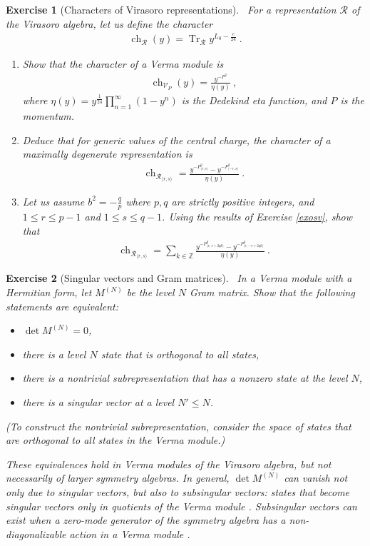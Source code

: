 \documentclass[12pt, a4paper, notitlepage, twoside]{report}
\numberwithin{equation}{section}
\theoremstyle{break}
\newtheorem{exo}{Exercise}[chapter]
\begin{document}
\begin{exo}[Characters of Virasoro representations]
 ~\label{exochar}
For a representation $\mathcal{R}$ of the Virasoro algebra, let us define the character 
\begin{align}
 \operatorname{ch}_\mathcal{R}(y) = \operatorname{Tr}_\mathcal{R} y^{L_0-\frac{c}{24}}\ .
\end{align}
\begin{enumerate}
 \item 
Show that the character of a Verma module is 
\begin{align}
 \operatorname{ch}_{\mathcal{V}_P}(y) = \frac{y^{-P^2}}{\eta(y)}\ ,
\end{align}
where $\eta(y) = y^{\frac{1}{24}}\prod_{n=1}^\infty(1-y^n)$ is the Dedekind eta function, and $P$ is the momentum. 
\item
Deduce that for generic values of the central charge, the character of a maximally degenerate representation is 
\begin{align}
 \operatorname{ch}_{\mathcal{R}_{\langle r,s\rangle}} = \frac{y^{-P^2_{\langle r,s\rangle}} - y^{-P^2_{\langle -r,s\rangle}}}{\eta(y)}\ .
\end{align}
\item
Let us assume $b^2=-\frac{q}{p}$ where $p,q$ are strictly positive integers, and $1\leq r\leq p-1$ and $1\leq s\leq q-1$. Using the results of Exercise \ref{exosv}, show that 
\begin{align}
 \operatorname{ch}_{\mathcal{R}_{\langle r,s\rangle}} = 
 \sum_{k\in\mathbb{Z}} \frac{y^{-P^2_{\langle r, s+2qk\rangle}} - y^{-P^2_{\langle r, -s+2qk\rangle}}}{\eta(y)}\ .
\end{align}
\end{enumerate}
\end{exo}

\begin{exo}[Singular vectors and Gram matrices]
 ~\label{exodmn}
 In a Verma module with a Hermitian form, let $M^{(N)}$ be the level $N$ Gram matrix. Show that the following statements are equivalent:
 \begin{itemize}
  \item $\det M^{(N)}=0$,
  \item there is a level $N$ state that is orthogonal to all states,
  \item there is a nontrivial subrepresentation that has a nonzero state at the level $N$,
  \item there is a singular vector at a level $N'\leq N$.
 \end{itemize}
(To construct the nontrivial subrepresentation, consider the space of states that are orthogonal to all states in the Verma module.)

These equivalences hold in Verma modules of the Virasoro algebra, but not necessarily of larger symmetry algebras. In general, $\det M^{(N)}$ can vanish not only due to singular vectors, but also to subsingular vectors: states that become singular vectors only in quotients of the Verma module \cite{dv95}. Subsingular vectors can exist when a zero-mode generator of the symmetry algebra has a non-diagonalizable action in a Verma module \cite{rad13}.
\end{exo}
\end{document}
